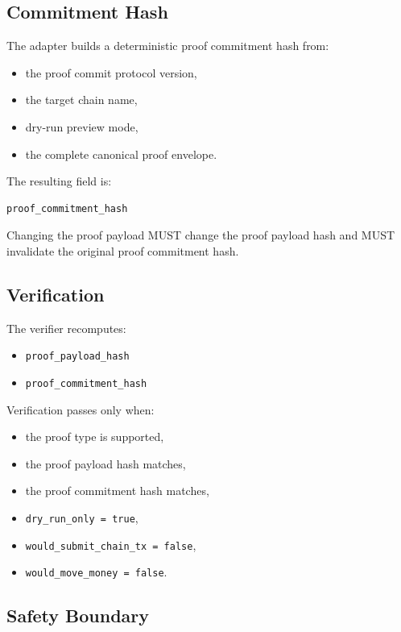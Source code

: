 \subsection{Commitment Hash}

The adapter builds a deterministic proof commitment hash from:

\begin{itemize}
  \item the proof commit protocol version,
  \item the target chain name,
  \item dry-run preview mode,
  \item the complete canonical proof envelope.
\end{itemize}

The resulting field is:

\begin{verbatim}
proof_commitment_hash
\end{verbatim}

Changing the proof payload MUST change the proof payload hash and MUST invalidate the original proof commitment hash.

\subsection{Verification}

The verifier recomputes:

\begin{itemize}
  \item \texttt{proof\_payload\_hash}
  \item \texttt{proof\_commitment\_hash}
\end{itemize}

Verification passes only when:

\begin{itemize}
  \item the proof type is supported,
  \item the proof payload hash matches,
  \item the proof commitment hash matches,
  \item \texttt{dry\_run\_only = true},
  \item \texttt{would\_submit\_chain\_tx = false},
  \item \texttt{would\_move\_money = false}.
\end{itemize}

\subsection{Safety Boundary}

